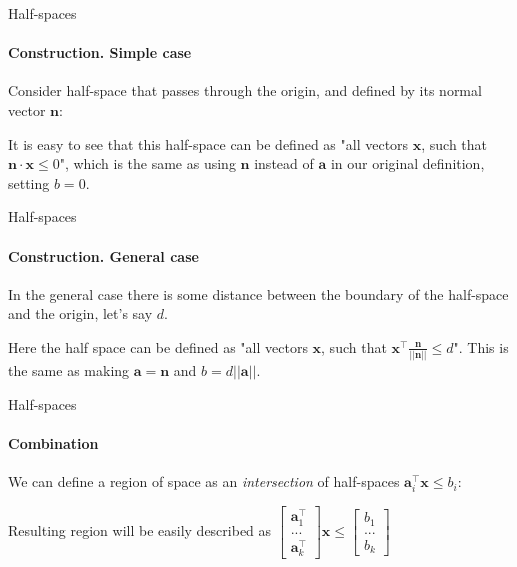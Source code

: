 \documentclass{beamer}
\begin{document}
\begin{frame}{Half-spaces}
\framesubtitle{Construction. Simple case}
\begin{flushleft}

Consider half-space that passes through the origin, and defined by its normal vector $\mathbf{n}$:



It is easy to see that this half-space can be defined as "all vectors $\mathbf{x}$, such that $\mathbf{n} \cdot \mathbf{x} \leq 0$", which is the same as using $\mathbf{n}$ instead of $\mathbf{a}$ in our original definition, setting $b = 0$.
 
\end{flushleft}
\end{frame}




\begin{frame}{Half-spaces}
\framesubtitle{Construction. General case}
\begin{flushleft}

In the general case there is some distance between the boundary of the half-space and the origin, let's say $d$.


%
Here the half space can be defined as "all vectors $\mathbf{x}$, such that $\mathbf{x}^\top \frac{\mathbf{n}}{|| \mathbf{n} ||}  \leq d$". This is the same as making $\mathbf{a} = \mathbf{n}$ and $b = d ||\mathbf{a}||$.
 
\end{flushleft}
\end{frame}



\begin{frame}{Half-spaces}
\framesubtitle{Combination}
\begin{flushleft}

We can define a region of space as an \emph{intersection} of half-spaces $\mathbf{a}_i^\top \mathbf{x} \leq b_i$:



Resulting region will be easily described as $\begin{bmatrix} \mathbf{a}_1^\top \\ ... \\ \mathbf{a}_k^\top \end{bmatrix} \mathbf{x} \leq \begin{bmatrix} b_1 \\ ... \\ b_k \end{bmatrix}$

 
\end{flushleft}
\end{frame}
\end{document}
